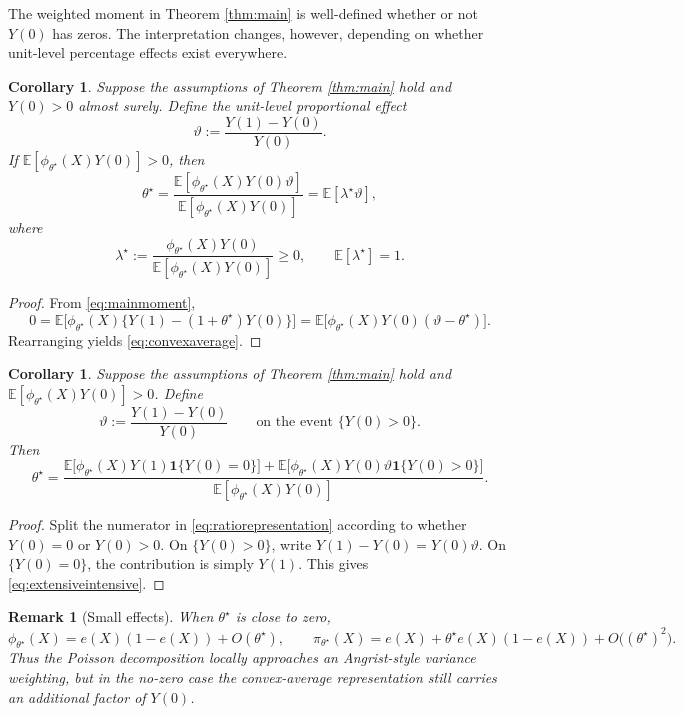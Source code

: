 \documentclass[11pt]{article}
\newtheorem{corollary}[theorem]{Corollary}
\newtheorem{remark}[theorem]{Remark}
\newcommand{\E}{\mathbb{E}}
\newcommand{\1}{\mathbf{1}}
\begin{document}
The weighted moment in Theorem \ref{thm:main} is well-defined whether or not $Y(0)$ has zeros. The interpretation changes, however, depending on whether unit-level percentage effects exist everywhere.

\begin{corollary}
\label{cor:nozeros}
Suppose the assumptions of Theorem \ref{thm:main} hold and $Y(0)>0$ almost surely. Define the unit-level proportional effect
\[
\vartheta:=\frac{Y(1)-Y(0)}{Y(0)}.
\]
If $\E[\phi_{\theta^\star}(X)Y(0)]>0$, then
\begin{equation}
\theta^\star
=
\frac{\E[\phi_{\theta^\star}(X)Y(0)\vartheta]}{\E[\phi_{\theta^\star}(X)Y(0)]}
=
\E[\lambda^\star\vartheta],
\label{eq:convexaverage}
\end{equation}
where
\[
\lambda^\star:=\frac{\phi_{\theta^\star}(X)Y(0)}{\E[\phi_{\theta^\star}(X)Y(0)]}\ge 0,
\qquad \E[\lambda^\star]=1.
\]
\end{corollary}

\begin{proof}
From \eqref{eq:mainmoment},
\[
0=\E\Big[\phi_{\theta^\star}(X)\{Y(1)-(1+\theta^\star)Y(0)\}\Big]
=\E\Big[\phi_{\theta^\star}(X)Y(0)(\vartheta-\theta^\star)\Big].
\]
Rearranging yields \eqref{eq:convexaverage}.
\end{proof}

\begin{corollary}
\label{cor:zeros}
Suppose the assumptions of Theorem \ref{thm:main} hold and $\E[\phi_{\theta^\star}(X)Y(0)]>0$. Define
\[
\vartheta:=\frac{Y(1)-Y(0)}{Y(0)} \qquad \text{on the event } \{Y(0)>0\}.
\]
Then
\begin{equation}
\theta^\star
=
\frac{
\E\big[\phi_{\theta^\star}(X)Y(1)\1\{Y(0)=0\}\big]
+
\E\big[\phi_{\theta^\star}(X)Y(0)\vartheta\1\{Y(0)>0\}\big]
}{\E[\phi_{\theta^\star}(X)Y(0)]}.
\label{eq:extensiveintensive}
\end{equation}
\end{corollary}

\begin{proof}
Split the numerator in \eqref{eq:ratiorepresentation} according to whether $Y(0)=0$ or $Y(0)>0$. On $\{Y(0)>0\}$, write $Y(1)-Y(0)=Y(0)\vartheta$. On $\{Y(0)=0\}$, the contribution is simply $Y(1)$. This gives \eqref{eq:extensiveintensive}.
\end{proof}

\begin{remark}[Small effects]
When $\theta^\star$ is close to zero,
\[
\phi_{\theta^\star}(X)=e(X)(1-e(X))+O(\theta^\star),
\qquad
\pi_{\theta^\star}(X)=e(X)+\theta^\star e(X)(1-e(X))+O\big((\theta^\star)^2\big).
\]
Thus the Poisson decomposition locally approaches an Angrist-style variance weighting, but in the no-zero case the convex-average representation still carries an additional factor of $Y(0)$.
\end{remark}
\end{document}
